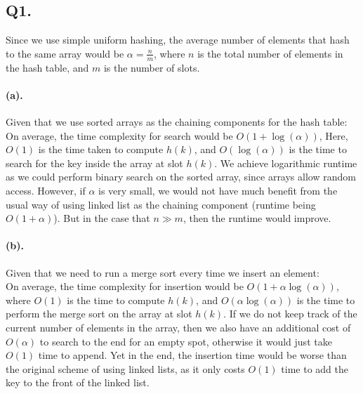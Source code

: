\documentclass[12pt]{article}
\begin{document}
\subsection*{Q1.}
Since we use simple uniform hashing, the average number of elements that hash to the same array would be \(\alpha = \frac{n}{m}\), where \(n\) is the total number of elements in the hash table, and \(m\) is the number of slots.

\paragraph{(a).} Given that we use sorted arrays as the chaining components for the hash table:\\ On average, the time complexity for search would be \(O(1+\log(\alpha))\),  Here, \(O(1)\) is the time taken to compute \(h(k)\), and \(O(\log(\alpha))\) is the time to search for the key inside the array at slot \(h(k)\). We achieve logarithmic runtime as we could perform binary search on the sorted array, since arrays allow random access. However, if \(\alpha\) is very small, we would not have much benefit from the usual way of using linked list as the chaining component (runtime being \(O(1+\alpha)\)). But in the case that \(n \gg m\), then the runtime would improve.

\paragraph{(b).} Given that we need to run a merge sort every time we insert an element:\\
On average, the time complexity for insertion would be \(O(1+\alpha\log(\alpha))\), where \(O(1)\) is the time to compute \(h(k)\), and \(O(\alpha\log(\alpha))\) is the time to perform the merge sort on the array at slot \(h(k)\). If we do not keep track of the current number of elements in the array, then we also have an additional cost of \(O(\alpha)\) to search to the end for an empty spot, otherwise it would just take \(O(1)\) time to append. Yet in the end, the insertion time would be worse than the original scheme of using linked lists, as it only costs \(O(1)\) time to add the key to the front of the linked list.
\end{document}
